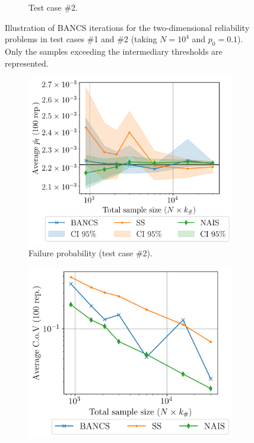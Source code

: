 \begin{figure}
\begin{subfigure}[b]{0.48\linewidth}
        \caption{Test case \#2.}
    \end{subfigure}
    \caption{Illustration of BANCS iterations for the two-dimensional reliability problems in test cases \#1 and \#2  (taking $N=10^4$ and $p_0=0.1$). 
    Only the samples exceeding the intermediary thresholds are represented.}
    \label{fig:2D_toycase_reliability}
\end{figure}



\begin{figure}
    \centering
    \begin{subfigure}[b]{0.49\linewidth}
        \centering
        \includegraphics[width=\linewidth]{part3/figures/BANCS/RP4B_mean.png}
        \caption{Failure probability (test case \#2).}
    \end{subfigure}
    \begin{subfigure}[b]{0.47\linewidth}
        \centering
        \includegraphics[width=\linewidth]{part3/figures/BANCS/RP4B_cov.png}

\end{subfigure}
\end{figure}
